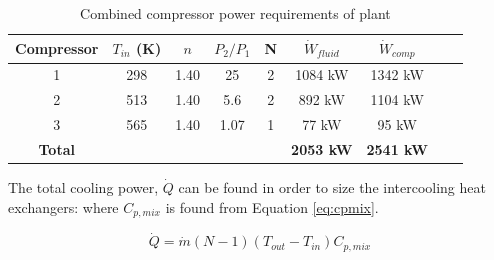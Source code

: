 \documentclass[11pt, a4paper]{article}
\begin{document}
{\begin{table}[!htbp]
	\begin{center}
		\label{tab:power}
		\caption{Combined compressor power requirements of plant}
		
		\begin{tabular}{|c|c|c|c|c|c|c|c|c|}
			\hline
			Compressor& $T_{in}$ (K)& $n$ & $P_2/P_1$ & N & $\dot{W}_{fluid}$ & $\dot{W}_{comp}$\\ \hline
			1      &298          & 1.40                & 25 &2 & 1084 kW & 1342 kW\\ \hline
			2& 513 &  1.40 & 5.6  & 2& 892 kW & 1104 kW\\ \hline
			3      & 565         & 1.40                 & 1.07 &1 &77 kW & 95 kW \\ \hline
				\textbf{Total}      &          &                  &  &  & \textbf{2053 kW}&\textbf{2541 kW}  \\ \hline
		\end{tabular}
		
	\end{center}
\end{table}

The total cooling power, $\dot{Q}$ can be found in order to size the intercooling heat exchangers: where $C_{p,mix}$ is found from Equation \ref{eq:cpmix}.


\begin{equation}
\label{eq:coolpowerQ}
\dot{Q} =\dot{m}(N-1)(T_{out}-T_{in})C_{p,mix}
\end{equation}

%
%		
%		
%
%


}
\end{document}
